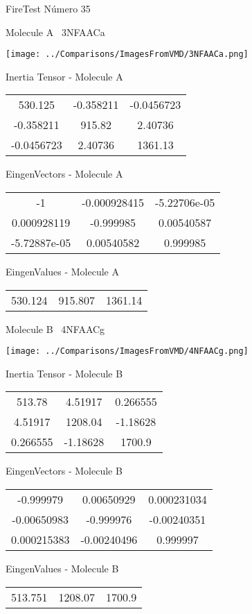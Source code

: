 \vtab[-3cm]
\begin{center}
{\large FireTest \tab Número 35}
\end{center}
\begin{multicols}{2}
\begin{center}

Molecule A \
3NFAACa

\texttt{[image: ../Comparisons/ImagesFromVMD/3NFAACa.png]}

Inertia Tensor - Molecule A \\
\begin{tabular}{|c c c|}
530.125	 & 	-0.358211	 & 	-0.0456723	 \\
-0.358211	 & 	915.82	 & 	2.40736	 \\
-0.0456723	 & 	2.40736	 & 	1361.13
\end{tabular}

\vtab
 EingenVectors - Molecule A     \\
\begin{tabular}{|c c c|}
-1	 & 	-0.000928415	 & 	-5.22706e-05	 \\
0.000928119	 & 	-0.999985	 & 	0.00540587	 \\
-5.72887e-05	 & 	0.00540582	 & 	0.999985
\end{tabular}

\vtab
 EingenValues - Molecule A     \\
\begin{tabular}{|c c c|}
530.124	 & 	915.807	 & 	1361.14	 \\
\end{tabular}
\columnbreak

Molecule B \
4NFAACg

\texttt{[image: ../Comparisons/ImagesFromVMD/4NFAACg.png]}

Inertia Tensor - Molecule B \\
\begin{tabular}{|c c c|}
513.78	 & 	4.51917	 & 	0.266555	 \\
4.51917	 & 	1208.04	 & 	-1.18628	 \\
0.266555	 & 	-1.18628	 & 	1700.9
\end{tabular}

\vtab
 EingenVectors - Molecule B     \\
\begin{tabular}{|c c c|}
-0.999979	 & 	0.00650929	 & 	0.000231034	 \\
-0.00650983	 & 	-0.999976	 & 	-0.00240351	 \\
0.000215383	 & 	-0.00240496	 & 	0.999997
\end{tabular}

\vtab
 EingenValues - Molecule B     \\
\begin{tabular}{|c c c|}
513.751	 & 	1208.07	 & 	1700.9	 \\
\end{tabular}

\end{center}
\end{multicols}

